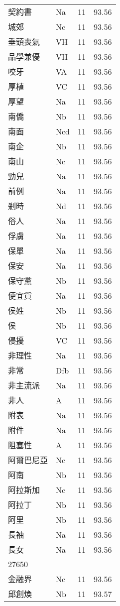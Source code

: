 \documentclass[twocolumn]{book}
\begin{document}
\begin{supertabular}{llrr}
契約書 & Na & 11 &  93.56\\
城郊 & Nc & 11 &  93.56\\
垂頭喪氣 & VH & 11 &  93.56\\
品學兼優 & VH & 11 &  93.56\\
咬牙 & VA & 11 &  93.56\\
厚植 & VC & 11 &  93.56\\
厚望 & Na & 11 &  93.56\\
南僑 & Nb & 11 &  93.56\\
南面 & Ncd & 11 &  93.56\\
南企 & Nb & 11 &  93.56\\
南山 & Nc & 11 &  93.56\\
勁兒 & Na & 11 &  93.56\\
前例 & Na & 11 &  93.56\\
剎時 & Nd & 11 &  93.56\\
俗人 & Na & 11 &  93.56\\
俘虜 & Na & 11 &  93.56\\
保單 & Na & 11 &  93.56\\
保安 & Na & 11 &  93.56\\
保守黨 & Nb & 11 &  93.56\\
便宜貨 & Na & 11 &  93.56\\
侯姓 & Nb & 11 &  93.56\\
侯 & Nb & 11 &  93.56\\
侵擾 & VC & 11 &  93.56\\
非理性 & Na & 11 &  93.56\\
非常 & Dfb & 11 &  93.56\\
非主流派 & Na & 11 &  93.56\\
非人 & A & 11 &  93.56\\
附表 & Na & 11 &  93.56\\
附件 & Na & 11 &  93.56\\
阻塞性 & A & 11 &  93.56\\
阿爾巴尼亞 & Nc & 11 &  93.56\\
阿南 & Nb & 11 &  93.56\\
阿拉斯加 & Nc & 11 &  93.56\\
阿拉丁 & Nb & 11 &  93.56\\
阿里 & Nb & 11 &  93.56\\
長袖 & Na & 11 &  93.56\\
長女 & Na & 11 &  93.56\\
27650\\
金融界 & Nc & 11 &  93.56\\
邱創煥 & Nb & 11 &  93.57\\

\end{supertabular}
\end{document}
